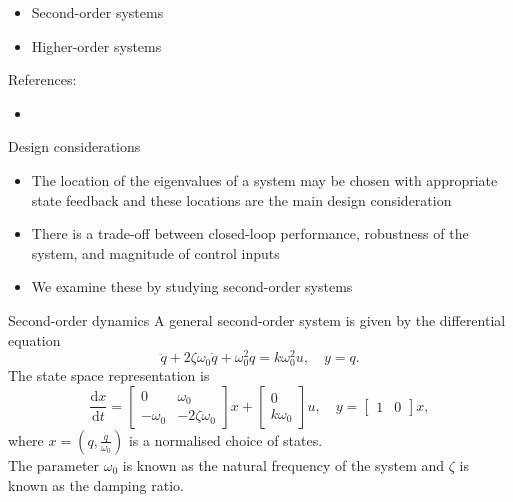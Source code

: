 \documentclass[10pt]{beamer-control}
\begin{document}

\begin{SUMMARY}
  \begin{itemize}
    \item Second-order systems
    \item Higher-order systems
  \end{itemize}
  \vfill References:
  \begin{itemize}
    \item \astrom[§7.3]
  \end{itemize}
\end{SUMMARY}





\begin{frame}{Design considerations}
  \begin{itemize}
    \item The location of the eigenvalues of a system may be chosen with appropriate state feedback and these locations are the main design consideration
    \item There is a trade-off between closed-loop performance, robustness of the system, and magnitude of control inputs
    \item We examine these by studying second-order systems
  \end{itemize}
\end{frame}


\begin{frame}{Second-order dynamics}
  A general second-order system is given by the differential equation
  \begin{equation}
    \ddot{q}+2\zeta \omega_0 \dot{q}+\omega_0^2q=k\omega_0^2u, \quad y=q.
  \end{equation}
  The state space representation is
  \begin{equation}
    \frac{\mathrm{d} x}{\mathrm{d} t}=\begin{bmatrix}
      0 & \omega_0 \\
      -\omega_0 & -2 \zeta \omega_0
    \end{bmatrix} x+\begin{bmatrix} 0 \\
      k \omega_0
    \end{bmatrix}u, \quad y=\begin{bmatrix}
      1 & 0
    \end{bmatrix} x,
  \end{equation}
  where $x=\left(q,\tfrac{\dot{q}}{\omega_0}\right)$ is a normalised choice of states.\\
  The parameter $\omega_0$ is known as the natural frequency of the system and $\zeta$ is known as the damping ratio.
\end{frame}
\end{document}
